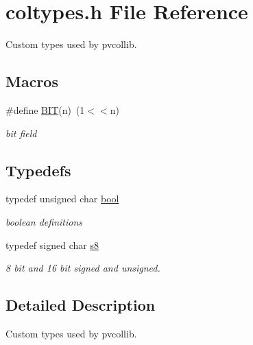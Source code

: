 \hypertarget{a00044}{}\section{coltypes.\+h File Reference}
\label{a00044}


Custom types used by pvcollib.  


\subsection*{Macros}
\begin{DoxyCompactItemize}
\item 
\mbox{\label{a00044_a3a8ea58898cb58fc96013383d39f482c}} 
\#define \hyperlink{a00044_a3a8ea58898cb58fc96013383d39f482c}{B\+IT}(n)~(1$<$$<$n)
\begin{DoxyCompactList}\small\item\em bit field \end{DoxyCompactList}\end{DoxyCompactItemize}
\subsection*{Typedefs}
\begin{DoxyCompactItemize}
\item 
\mbox{\label{a00044_a97a80ca1602ebf2303258971a2c938e2}} 
typedef unsigned char \hyperlink{a00044_a97a80ca1602ebf2303258971a2c938e2}{bool}
\begin{DoxyCompactList}\small\item\em boolean definitions \end{DoxyCompactList}\item 
\mbox{\label{a00044_a151f780fb455885061d3b77ec1c90c03}} 
typedef signed char \hyperlink{a00044_a151f780fb455885061d3b77ec1c90c03}{s8}
\begin{DoxyCompactList}\small\item\em 8 bit and 16 bit signed and unsigned. \end{DoxyCompactList}\end{DoxyCompactItemize}


\subsection{Detailed Description}
Custom types used by pvcollib. 

